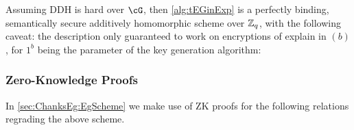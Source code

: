 \begin{theorem}\label{thm:tEGinExp}
	Assuming DDH is hard over $\cG$, then \cref{alg:tEGinExp} is  a perfectly binding,  semantically secure additively homomorphic scheme over ${\mathbb Z}_q$, with the following caveat:  the description only guaranteed to work on encryptions of explain in $(b)$,   for $1^b$ being the parameter  of the key generation algorithm:
\end{theorem}



\subsubsection{Zero-Knowledge Proofs}
In \cref{sec:ChanksEg:EgScheme} we make use of ZK proofs for the following relations regrading the above scheme.  


